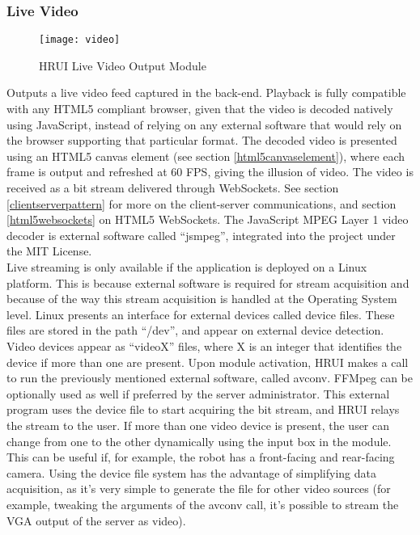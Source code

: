 \subsubsection{Live Video} \label{livevideo}
\begin{figure}[H]
\centering
\captionsetup{justification=centering}
\texttt{[image: video]}
\caption{HRUI Live Video Output Module}
\end{figure}
Outputs a live video feed captured in the back-end. Playback is fully compatible with any HTML5 compliant browser, given that 
the video is decoded natively using JavaScript, instead of relying on any external software that would rely on the browser 
supporting that particular format. The decoded video is presented using an HTML5 canvas element (see section 
\ref{html5canvaselement}), where each frame is output and refreshed at 60 FPS, giving the illusion of video. The video is 
received as a bit stream delivered through WebSockets. See section \ref{clientserverpattern} for more on the client-server 
communications, and section \ref{html5websockets} on HTML5 WebSockets. The JavaScript MPEG Layer 1 video decoder is external software called ``jsmpeg''\cite{jsmpeg15}, integrated into the project under the MIT License.\\

Live streaming is only available if the application is deployed on a Linux platform. This is because external software is 
required for stream acquisition and because of the way this stream acquisition is handled at the Operating System level. Linux 
presents an interface for external devices called device files. These files are stored in the path ``/dev'', and appear on 
external device detection. Video devices appear as ``videoX'' files, where X is an integer that identifies the device if more 
than one are present. Upon module activation, HRUI makes a call to run the previously mentioned external software, called 
avconv\cite{avconv15}. FFMpeg can be optionally used as well if preferred by the server administrator. This external program 
uses the device file to start acquiring the bit stream, and HRUI relays the stream to the user. If more than one video device 
is present, the user can change from one to the other dynamically using the input box in the module. This can be useful if, 
for example, the robot has a front-facing and rear-facing camera. Using the device file system has the advantage of 
simplifying data acquisition, as it's very simple to generate the file for other video sources (for example, tweaking the 
arguments of the avconv call, it's possible to stream the VGA output of the server as video).\\

